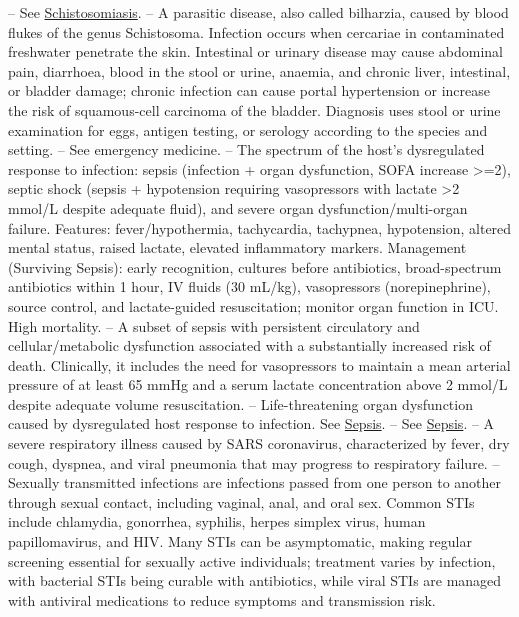 -- See \hyperlink{Schistosomiasis}{Schistosomiasis}.
-- A parasitic disease, also called bilharzia, caused by blood flukes of the genus Schistosoma. Infection occurs when cercariae in contaminated freshwater penetrate the skin. Intestinal or urinary disease may cause abdominal pain, diarrhoea, blood in the stool or urine, anaemia, and chronic liver, intestinal, or bladder damage; chronic infection can cause portal hypertension or increase the risk of squamous-cell carcinoma of the bladder. Diagnosis uses stool or urine examination for eggs, antigen testing, or serology according to the species and setting.
-- See emergency medicine.
-- The spectrum of the host's dysregulated response to infection: sepsis (infection + organ dysfunction, SOFA increase >=2), septic shock (sepsis + hypotension requiring vasopressors with lactate >2 mmol/L despite adequate fluid), and severe organ dysfunction/multi-organ failure. Features: fever/hypothermia, tachycardia, tachypnea, hypotension, altered mental status, raised lactate, elevated inflammatory markers. Management (Surviving Sepsis): early recognition, cultures before antibiotics, broad-spectrum antibiotics within 1 hour, IV fluids (30 mL/kg), vasopressors (norepinephrine), source control, and lactate-guided resuscitation; monitor organ function in ICU. High mortality.
-- A subset of sepsis with persistent circulatory and cellular/metabolic dysfunction associated with a substantially increased risk of death. Clinically, it includes the need for vasopressors to maintain a mean arterial pressure of at least 65 mmHg and a serum lactate concentration above 2 mmol/L despite adequate volume resuscitation.
-- Life-threatening organ dysfunction caused by dysregulated host response to infection. See \hyperlink{Sepsis}{Sepsis}.
-- See \hyperlink{Sepsis}{Sepsis}.
-- A severe respiratory illness caused by SARS coronavirus, characterized by fever, dry cough, dyspnea, and viral pneumonia that may progress to respiratory failure.
-- Sexually transmitted infections are infections passed from one person to another through sexual contact, including vaginal, anal, and oral sex. Common STIs include chlamydia, gonorrhea, syphilis, herpes simplex virus, human papillomavirus, and HIV. Many STIs can be asymptomatic, making regular screening essential for sexually active individuals; treatment varies by infection, with bacterial STIs being curable with antibiotics, while viral STIs are managed with antiviral medications to reduce symptoms and transmission risk.

